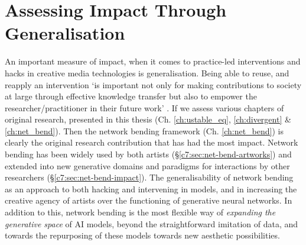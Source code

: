 \section{Assessing Impact Through Generalisation}
\label{c8:sec:generalisation}

An important measure of impact, when it comes to practice-led interventions and hacks in creative media technologies is generalisation.
Being able to reuse, and reapply an intervention `is important not only for making contributions to society at large through effective knowledge transfer but also to empower the researcher/practitioner in their future work' \citep{brown2009integrating}.
If we assess various chapters of original research, presented in this thesis (Ch. \ref{ch:ustable_eq}, \ref{ch:divergent} \& \ref{ch:net_bend}). 
Then the network bending framework (Ch. \ref{ch:net_bend}) is clearly the original research contribution that has had the most impact. 
Network bending has been widely used by both artists (\S \ref{c7:sec:net-bend-artworks}) and extended into new generative domains and paradigms for interactions by other researchers (\S \ref{c7:sec:net-bend-impact}).
The generalisability of network bending as an approach to both hacking and intervening in models, and in increasing the creative agency of artists over the functioning of generative neural networks.
In addition to this, network bending is the most flexible way of \textit{expanding the generative space} of AI models, beyond the straightforward imitation of data, and towards the repurposing of these models towards new aesthetic possibilities. 
